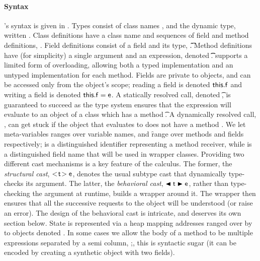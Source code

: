 \documentclass[runnningheads]{tex/llncs}
\begin{document}
\paragraph{Syntax}  
\kafka's syntax is given in .  Types consist of class names \C,
\D and the dynamic type, written \any.  Class definitions have a class name
and sequences of field and method definitions,
\Class{}. Field definitions consist of a field and its
type, \Fdef\f\t. Method definitions have (for simplicity) a single argument
and an expression, denoted \Mdef\m\x\t\t\e.  \kafka supports a limited form
of overloading, allowing both a typed implementation and an untyped
implementation for each method.  Fields are private to objects, and can be
accessed only from the object's scope; reading a field is denoted
\(\FRead\f\) and writing a field is denoted \(\FWrite\f\e \).  A statically
resolved call, denoted \KCall\e\m\ep\t\tp, is guaranteed to succeed as the
type system ensures that the expression \e will evaluate to an object of a
class which has a method \Mtype\m\t\tp. A dynamically resolved call,
\DynCall\e\m\ep, can get stuck if the object that \e evaluates to does not
have a method \Mtype\m\any\any.  We let meta-variables \x ranges over
variable names, \m and \f range over methods and fields respectively; \this
is a distinguished identifier representing a method receiver, while \that is
a distinguished field name that will be used in wrapper classes.  Providing
two different cast mechanisms is a key feature of the calculus.  The former,
the \emph{structural cast}, \(\SubCast\t\e\), denotes the usual subtype cast
that dynamically type-checks its argument.  The latter, the \emph{behavioral
  cast}, \(\BehCast\t\e\), rather than type-checking the argument at
runtime, builds a wrapper around it.  The wrapper then ensures that all the
successive requests to the object will be understood (or raise an
error). The design of the behavioral cast is intricate, and deserves its own
section below.  State is represented via a heap \s mapping addresses ranged
over by \a to objects denoted \hspace{-1mm}\obj{}. In some cases
we allow the body of a method to be multiple expressions separated by
a semi column, \e;\e, this is syntactic sugar (it can be encoded by creating
a synthetic object with two fields).
\end{document}
